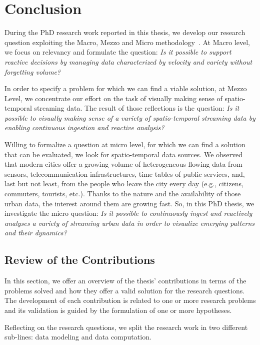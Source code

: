 \chapter{Conclusion}\label{ch:conclusion}

During the PhD research work reported in this thesis, we develop our research question exploiting the Macro, Mezzo and Micro methodology~\cite{lacasse2015making}.
At Macro level, we focus on relevancy and formulate the question: \textit{Is it possible to support reactive decisions by managing data characterized by velocity and variety without forgetting volume?}

In order to specify a problem for which we can find a viable solution, at Mezzo Level, we concentrate our effort on the task of visually making sense of spatio-temporal streaming data. The result of those reflections is the question: \textit{Is it possible to visually making sense of a variety of spatio-temporal streaming data by enabling continuous ingestion and reactive analysis?}

Willing to formalize a question at micro level, for which we can find a solution that can be evaluated, we look for spatio-temporal data sources.
We observed that modern cities offer a growing volume of heterogeneous flowing data from sensors, telecommunication infrastructures, time tables of public services, and, last but not least, from the people who leave the city every day (e.g., citizens, commuters, tourists, etc.).
Thanks to the nature and the availability of those urban data, the interest around them are growing fast.
So, in this PhD thesis, we investigate the micro question: \textit{Is it possible to continuously ingest and reactively analyses a variety of streaming urban data in order to visualize emerging patterns and their dynamics?}

\section{Review of the Contributions}

In this section, we offer an overview of the thesis' contributions in terms of the problems solved and how they offer a valid solution for the research questions.
The development of each contribution is related to one or more research problems and its validation is guided by the formulation of one or more hypotheses.

Reflecting on the research questions, we split the research work in two different sub-lines: data modeling and data computation.

